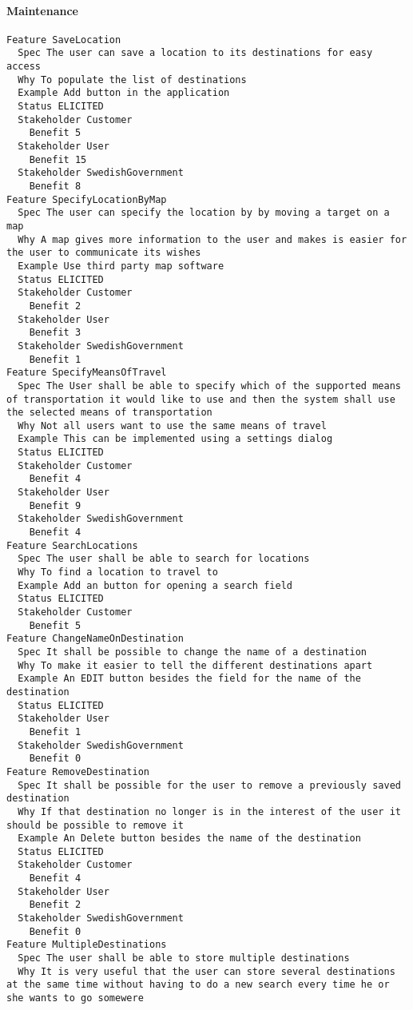         
       \paragraph{Maintenance}


\begin{lstlisting}
Feature SaveLocation
  Spec The user can save a location to its destinations for easy access
  Why To populate the list of destinations
  Example Add button in the application
  Status ELICITED
  Stakeholder Customer
    Benefit 5
  Stakeholder User
    Benefit 15
  Stakeholder SwedishGovernment
    Benefit 8
Feature SpecifyLocationByMap
  Spec The user can specify the location by by moving a target on a map
  Why A map gives more information to the user and makes is easier for the user to communicate its wishes
  Example Use third party map software
  Status ELICITED
  Stakeholder Customer
    Benefit 2
  Stakeholder User
    Benefit 3
  Stakeholder SwedishGovernment
    Benefit 1
Feature SpecifyMeansOfTravel
  Spec The User shall be able to specify which of the supported means of transportation it would like to use and then the system shall use the selected means of transportation
  Why Not all users want to use the same means of travel
  Example This can be implemented using a settings dialog
  Status ELICITED
  Stakeholder Customer
    Benefit 4
  Stakeholder User
    Benefit 9
  Stakeholder SwedishGovernment
    Benefit 4
Feature SearchLocations
  Spec The user shall be able to search for locations
  Why To find a location to travel to
  Example Add an button for opening a search field
  Status ELICITED
  Stakeholder Customer
    Benefit 5
Feature ChangeNameOnDestination
  Spec It shall be possible to change the name of a destination
  Why To make it easier to tell the different destinations apart
  Example An EDIT button besides the field for the name of the destination
  Status ELICITED
  Stakeholder User
    Benefit 1
  Stakeholder SwedishGovernment
    Benefit 0
Feature RemoveDestination
  Spec It shall be possible for the user to remove a previously saved destination
  Why If that destination no longer is in the interest of the user it should be possible to remove it
  Example An Delete button besides the name of the destination
  Status ELICITED
  Stakeholder Customer
    Benefit 4
  Stakeholder User
    Benefit 2
  Stakeholder SwedishGovernment
    Benefit 0
Feature MultipleDestinations
  Spec The user shall be able to store multiple destinations
  Why It is very useful that the user can store several destinations at the same time without having to do a new search every time he or she wants to go somewere

\end{lstlisting}
